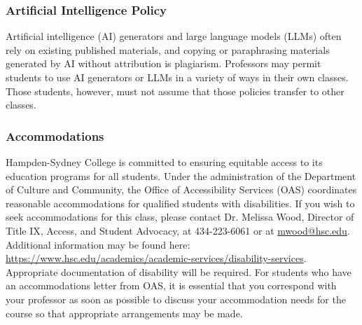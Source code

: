 \documentclass[10pt]{article}
\begin{document}
\subsubsection*{Artificial Intelligence Policy}

Artificial intelligence (AI) generators and large language models (LLMs) often rely on existing published materials, and copying or paraphrasing materials generated by AI without attribution is plagiarism. Professors may permit students to use AI generators or LLMs in a variety of ways in their own classes. Those students, however, must not assume that those policies transfer to other classes.

\subsubsection*{Accommodations}

Hampden-Sydney College is committed to ensuring equitable access to its education programs for all students. Under the administration of the Department of Culture and Community, the Office of Accessibility Services (OAS) coordinates reasonable accommodations for qualified students with disabilities. If you wish to seek accommodations for this class, please contact Dr. Melissa Wood, Director of Title IX, Access, and Student Advocacy, at 434-223-6061 or at \url{mwood@hsc.edu}. Additional information may be found here: \url{https://www.hsc.edu/academics/academic-services/disability-services}. Appropriate documentation of disability will be required. For students who have an accommodations letter from OAS, it is essential that you correspond with your professor as soon as possible to discuss your accommodation needs for the course so that appropriate arrangements may be made. 
\end{document}
